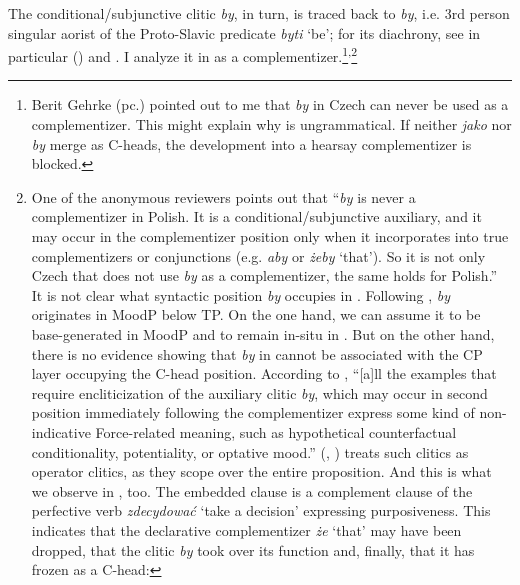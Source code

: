 \documentclass[output=paper
,modfonts
,nonflat]{langsci/langscibook}
\begin{document}
The conditional\slash subjunctive clitic \emph{by}, in turn, is traced back to \*\emph{by}, i.e. 3rd person singular aorist of the Proto-Slavic predicate \*\emph{byti} `be'; for its diachrony, see in particular \citeauthor{Migdalski2016} (\citeyear{Migdalski2006, Migdalski2009, Migdalski2016}) and \textcite{Willis2000}. I analyze it in  as a complementizer.\footnote{Berit Gehrke (pc.) pointed out to me that \emph{by} in Czech can never be used as a complementizer. This might explain why  is ungrammatical. If neither \emph{jako} nor \emph{by} merge as C-heads, the development into a hearsay complementizer is blocked.
}\textsuperscript{,}\footnote{One of the anonymous reviewers points out that ``\emph{by} is never a complementizer in Polish. It is a conditional\slash subjunctive auxiliary, and it may occur in the complementizer position only when it incorporates into true complementizers or conjunctions (e.g. \emph{aby} or \emph{żeby} `that'). So it is not only Czech that does not use \emph{by} as a complementizer, the same holds for Polish.'' It is not clear what syntactic position \emph{by} occupies in . Following \textcite{Migdalski2006}, \emph{by} originates in MoodP below TP. On the one hand, we can assume it to be base-generated in MoodP and to remain in-situ in . But on the other hand, there is no evidence showing that \emph{by} in   cannot be associated with the CP layer occupying the C-head position. According to  \textcite[171]{Migdalski2016}, ``[a]ll the examples that require encliticization of the auxiliary clitic \emph{by}, which may occur in second position immediately following the complementizer express some kind of non-indicative Force-related meaning, such as hypothetical counterfactual conditionality, potentiality, or optative mood.'' \citeauthor{Tomic2001} (\citeyear{Tomic2000}, \citeyear{Tomic2001}) treats such clitics as operator clitics, as they scope over the entire proposition. And this is what we observe in , too. The embedded clause is a complement clause of the perfective verb \emph{zdecydować} `take a decision' expressing purposiveness. This indicates that the declarative complementizer \emph{że} `that' may have been dropped, that the clitic \emph{by} took over its function and, finally, that it has frozen as a C-head:         

}
\end{document}
